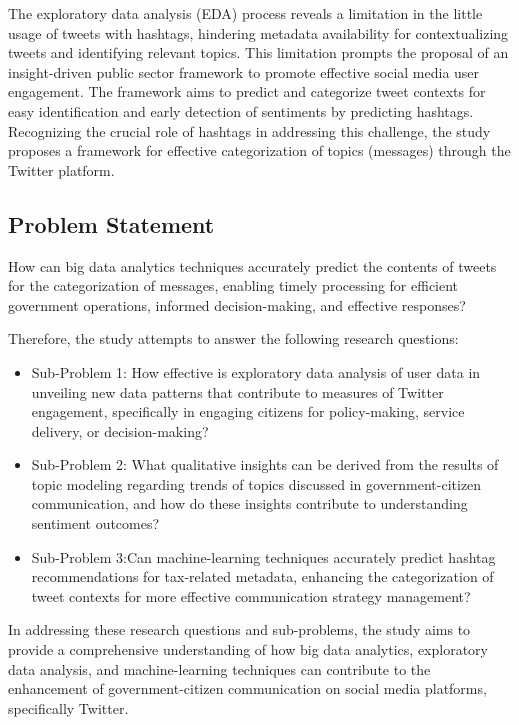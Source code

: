 The exploratory data analysis (EDA) process reveals a limitation in the little usage of tweets with hashtags, hindering metadata availability for contextualizing tweets and identifying relevant topics. This limitation prompts the proposal of an insight-driven public sector framework to promote effective social media user engagement. The framework aims to predict and categorize tweet contexts for easy identification and early detection of sentiments by predicting hashtags. Recognizing the crucial role of hashtags in addressing this challenge, the study proposes a framework for effective categorization of topics (messages) through the Twitter platform.

\subsection{Problem Statement}
How can big data analytics techniques accurately predict the contents of tweets for the categorization of messages, enabling timely processing for efficient government operations, informed decision-making, and effective responses?

Therefore, the study attempts to answer the following research questions:

\begin{itemize}
    \item Sub-Problem 1:  How effective is exploratory data analysis of user data in unveiling new data patterns that contribute to measures of Twitter engagement, specifically in engaging citizens for policy-making, service delivery, or decision-making?
    \end{itemize}

\begin{itemize}
    \item Sub-Problem 2:  What qualitative insights can be derived from the results of topic modeling regarding trends of topics discussed in government-citizen communication, and how do these insights contribute to understanding sentiment outcomes?
    \end{itemize}

\begin{itemize}
    \item Sub-Problem 3:Can machine-learning techniques accurately predict hashtag recommendations for tax-related metadata, enhancing the categorization of tweet contexts for more effective communication strategy management?
\end{itemize}

In addressing these research questions and sub-problems, the study aims to provide a comprehensive understanding of how big data analytics, exploratory data analysis, and machine-learning techniques can contribute to the enhancement of government-citizen communication on social media platforms, specifically Twitter.

